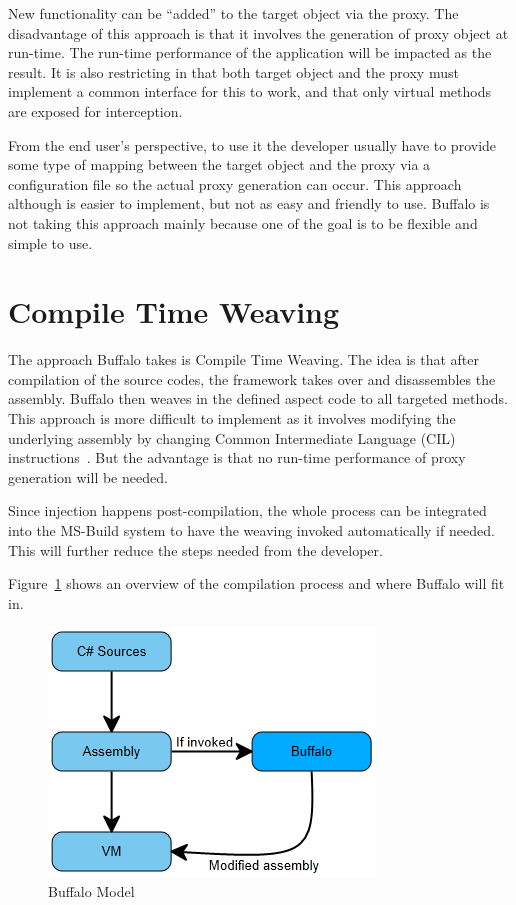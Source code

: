New functionality can be “added” to the target object via the proxy. The disadvantage of this approach is that it involves the generation of proxy object at run-time. The run-time performance of the application will be impacted as the result. It is also restricting in that both target object and the proxy must implement a common interface for this to work, and that only virtual methods are exposed for interception.

From the end user's perspective, to use it the developer usually have to provide some type of mapping between the target object and the proxy via a configuration file so the actual proxy generation can occur. This approach although is easier to implement, but not as easy and friendly to use. Buffalo is not taking this approach mainly because one of the goal is to be flexible and simple to use.

\section{Compile Time Weaving}

The approach Buffalo takes is Compile Time Weaving. The idea is that after compilation of the source codes, the framework takes over and disassembles the assembly. Buffalo then weaves in the defined aspect code to all targeted methods. This approach is more difficult to implement as it involves modifying the underlying assembly by changing Common Intermediate Language (CIL) instructions~\cite{rewrite_msil}. But the advantage is that no run-time performance of proxy generation will be needed. 

Since injection happens post-compilation, the whole process can be integrated into the MS-Build system to have the weaving invoked automatically if needed. This will further reduce the steps needed from the developer.

Figure~\ref{buffalo_model} shows an overview of the compilation process and where Buffalo will fit in.

\begin{figure}[H]
  \includegraphics[scale=1.0]{BuffaloOverview.PNG}
  \centering
  \caption{Buffalo Model\label{buffalo_model}}
\end{figure}

